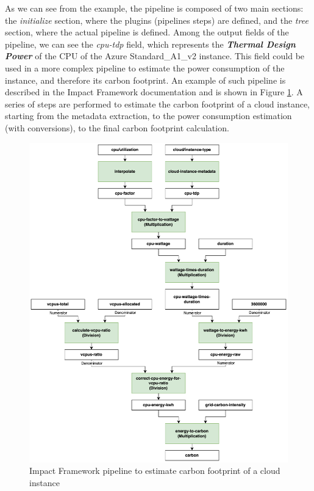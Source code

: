 As we can see from the example, the pipeline is composed of two main sections: the \textit{initialize} section, where the plugins (pipelines steps) are defined, and the \textit{tree} section, where the actual pipeline is defined.
Among the output fields of the pipeline, we can see the \textit{cpu-tdp} field, which represents the \textbf{\textit{Thermal Design Power}} of the CPU of the Azure Standard\_A1\_v2 instance.
This field could be used in a more complex pipeline to estimate the power consumption of the instance, and therefore its carbon footprint.
An example of such pipeline is described in the Impact Framework documentation \cite{impact_framework_pipeline} and is shown in Figure \ref{fig:impact_framework}.
A series of steps are performed to estimate the carbon footprint of a cloud instance, starting from the metadata extraction, to the power consumption estimation (with conversions), to the final carbon footprint calculation.

\newpage

\begin{figure}[H]
  \centering
  \includegraphics[width=1\linewidth]{images/impact_framework.png}
  \caption{Impact Framework pipeline to estimate carbon footprint of a cloud instance}
  \label{fig:impact_framework}
\end{figure}


